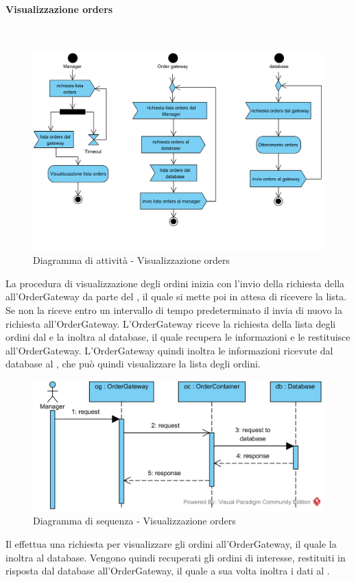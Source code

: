 \paragraph{Visualizzazione orders}\mbox{}\\
\nopagebreak
\begin{figure}[H]
	\centering
	\includegraphics[width=14cm]{diagrammi_img/attivita/manager_ordini.png}
	\caption{Diagramma di attività - Visualizzazione orders}
\end{figure}
La procedura di visualizzazione degli ordini inizia con l'invio della richiesta della  all'OrderGateway da parte del \Manager{}, il quale si mette poi in attesa di ricevere la lista. Se non la riceve entro un intervallo di tempo predeterminato il \Manager{} invia di nuovo la richiesta all'OrderGateway. L'OrderGateway riceve la richiesta della lista degli ordini dal \Manager{} e la inoltra al database, il quale recupera le informazioni e le restituisce all'OrderGateway. L'OrderGateway quindi inoltra le informazioni ricevute dal database al \Manager{}, che può quindi visualizzare la lista degli ordini.

\begin{figure}[H]
	\centering
	\includegraphics[width=14cm]{../../documenti/SpecificaTecnica/diagrammi_img/sequenza/direttore_visualizza_orders.png}
	\caption{Diagramma di sequenza - Visualizzazione orders}
\end{figure}
Il \Manager{} effettua una richiesta per visualizzare gli ordini all'Order\-Gateway, il quale la inoltra al database. Vengono quindi recuperati gli ordini di interesse, restituiti in risposta dal database all'Order\-Gateway, il quale a sua volta inoltra i dati al \Manager{}.


